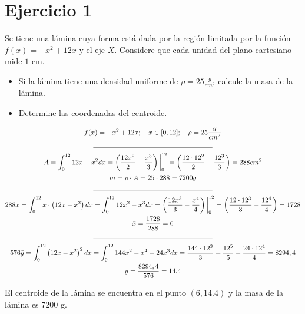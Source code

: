 \section*{Ejercicio 1}
\noindent Se tiene una lámina cuya forma está dada por la región limitada por la función \(f(x) = -x^2 + 12x\) y el eje
\(X\). Considere que cada unidad del plano cartesiano mide \(1\) cm.
\begin{itemize}
  \item Si la lámina tiene una densidad uniforme de \(\rho = 25 \frac{g}{cm^2}\) calcule la masa de la lámina.
  \item Determine las coordenadas del centroide.
\end{itemize}

\begin{gather*}
  f(x) = -x^2 + 12x; \quad x \in [0, 12]; \quad \rho = 25 \frac{g}{cm^2} \\
  \rule{0.5\textwidth}{0.4pt} \\
  A = \int_{0}^{12} 12x - x^2 dx %
    = \left(\frac{12x^2}{2} - \frac{x^3}{3}\right)\bigg|_{0}^{12} %
    = \left(\frac{12 \cdot 12^2}{2} - \frac{12^3}{3}\right) %
    = 288 cm^2 \\
  m = \rho \cdot A = 25 \cdot 288 = 7200 g \\
  \rule{0.5\textwidth}{0.4pt} \\
  288\bar{x} = \int_{0}^{12} x \cdot \left(12x - x^2\right) dx %
    = \int_{0}^{12} 12x^2 - x^3 dx %
    = \left(\frac{12x^3}{3} - \frac{x^4}{4}\right)\bigg|_{0}^{12} %
    = \left(\frac{12 \cdot 12^3}{3} - \frac{12^4}{4}\right)
    = 1728 \\
  \bar{x} = \frac{1728}{288} = 6 \\
  \rule{0.5\textwidth}{0.4pt} \\
  576\bar{y} = \int_{0}^{12} \left(12x - x^2\right)^2 dx %
    = \int_{0}^{12} 144x^2 - x^4 - 24x^3 dx %
    = \frac{144 \cdot 12^3}{3} + \frac{12^5}{5} - \frac{24 \cdot 12^4}{4} %
    = 8294,4  \\
  \bar{y} = \frac{8294,4}{576} = 14.4
\end{gather*}

\noindent El centroide de la lámina se encuentra en el punto \((6, 14.4)\) y la masa de la lámina es \(7200\) g.